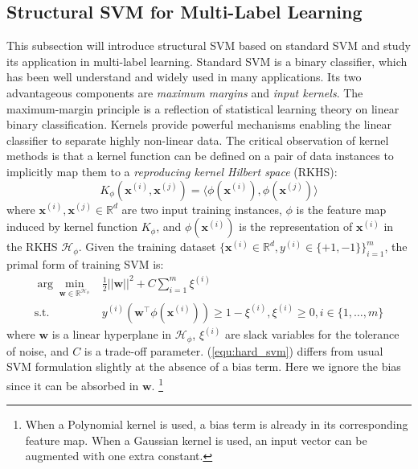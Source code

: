 \subsection{Structural SVM for Multi-Label Learning}
This subsection will introduce structural SVM based on standard SVM and study its application 
in multi-label learning. 
Standard SVM is a binary classifier, which has been well 
understand and widely used in many applications.  
Its two advantageous components are \emph{maximum margins} and \emph{input kernels}. 
The maximum-margin principle is a reflection of statistical learning theory \citep{Vapnik} on 
linear binary classification. 
Kernels provide powerful mechanisms enabling the linear classifier to separate highly non-linear data. 
The critical observation of kernel methods is that a kernel function can be defined on a pair of data 
instances to implicitly map them to a \emph{reproducing kernel Hilbert space} (RKHS):   
\begin{equation}
    K_\phi(\mathbf{x}^{(i)},\mathbf{x}^{(j)})=\langle \phi(\mathbf{x}^{(i)}),\phi(\mathbf{x}^{(j)}) \rangle
 \label{equ:kernel_trick}
\end{equation}
where $\mathbf{x}^{(i)}, \mathbf{x}^{(j)}\in\mathbb{R}^d$ are two input training instances, $\phi$ is the feature map induced by kernel function $K_\phi$, and $\phi(\mathbf{x}^{(i)})$ is the 
representation of 
$\mathbf{x}^{(i)}$ in the RKHS $\mathcal{H}_\phi$.
Given the training dataset $\{\mathbf{x}^{(i)}\in\mathbb{R}^d,y^{(i)}\in\{+1,-1\}\}_{i=1}^m$, the primal form of training SVM is:
\begin{equation}
\begin{array}{rl} 
    \displaystyle \arg\min_{ \mathbf{w} \in \mathbb{R}^{\mathcal{H_{\phi}}}}   & \frac{1}{2} ||\mathbf{w}||^2+C\sum_{i=1}^m \xi^{(i)} \\
    \text{s.t.} & y^{(i)} \left(\mathbf{w}^\top \phi (\mathbf{x}^{(i)})\right) \geq 1-\xi^{(i)}, \xi^{(i)} \geq 0,  i\in \{1,\dots,m\}
\end{array}
\label{equ:hard_svm}
\end{equation}
where $\mathbf{w}$ is a linear hyperplane in $\mathcal{H}_\phi$, $\xi^{(i)}$ are slack variables for the tolerance of noise, and $C$ is a trade-off parameter. 
(\ref{equ:hard_svm}) differs from usual SVM formulation slightly at the absence of a bias term. Here we ignore the bias since 
it can be absorbed in $\mathbf{w}$. 
\footnote{When a Polynomial kernel is used, a bias term is already in its corresponding feature map. When a Gaussian kernel is used, an input vector can be 
augmented with one extra constant.}


